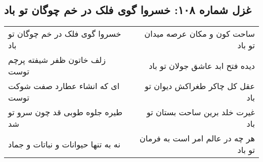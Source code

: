 \begin{center}
\section*{غزل شماره ۱۰۸: خسروا گوی فلک در خم چوگان تو باد}
\label{sec:sh108}
\begin{longtable}{l p{0.5cm} r}
خسروا گوی فلک در خم چوگان تو باد
&&
ساحت کون و مکان عرصه میدان تو باد
\\
زلف خاتون ظفر شیفته پرچم توست
&&
دیده فتح ابد عاشق جولان تو باد
\\
ای که انشاء عطارد صفت شوکت توست
&&
عقل کل چاکر طغراکش دیوان تو باد
\\
طیره جلوه طوبی قد چون سرو تو شد
&&
غیرت خلد برین ساحت بستان تو باد
\\
نه به تنها حیوانات و نباتات و جماد
&&
هر چه در عالم امر است به فرمان تو باد
\\
\end{longtable}
\end{center}
